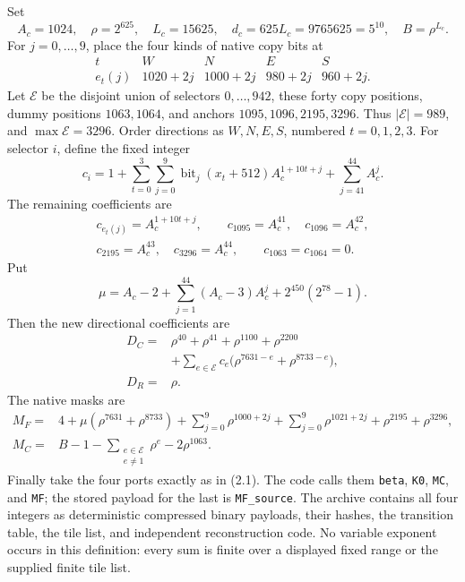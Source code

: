 Set
\[
A_c=1024,\quad \rho=2^{625},\quad L_c=15625,\quad
d_c=625L_c=9765625=5^{10},\quad B=\rho^{L_c}.
\tag{7.1}
\]
For \(j=0,\ldots,9\), place the four kinds of native copy bits at
\[
\begin{array}{c|rrrr}
t&W&N&E&S\\ \hline
e_t(j)&1020+2j&1000+2j&980+2j&960+2j.
\end{array}
\tag{7.2}
\]
Let \(\mathcal E\) be the disjoint union of selectors \(0,\ldots,942\),
these forty copy positions, dummy positions \(1063,1064\), and
anchors \(1095,1096,2195,3296\).
Thus \(|\mathcal E|=989\), and \(\max\mathcal E=3296\).
Order directions as \(W,N,E,S\), numbered \(t=0,1,2,3\).
For selector \(i\), define the fixed integer
\[
c_i=1+\sum_{t=0}^3\sum_{j=0}^9
 \operatorname{bit}_j(x_t+512)A_c^{1+10t+j}
 +\sum_{j=41}^{44}A_c^j.
\tag{7.3}
\]
The remaining coefficients are
\[
\begin{gathered}
c_{e_t(j)}=A_c^{1+10t+j},\qquad
c_{1095}=A_c^{41},\quad c_{1096}=A_c^{42},\\
c_{2195}=A_c^{43},\quad c_{3296}=A_c^{44},\qquad
c_{1063}=c_{1064}=0.
\end{gathered}
\]
Put
\[
\mu=A_c-2+\sum_{j=1}^{44}(A_c-3)A_c^j
       +2^{450}(2^{78}-1).
\]
Then the new directional coefficients are
\[
\begin{split}
D_C={}&\rho^{40}+\rho^{41}+\rho^{1100}+\rho^{2200}\\
 &+\sum_{e\in\mathcal E}c_e
       \bigl(\rho^{7631-e}+\rho^{8733-e}\bigr),\\
D_R={}&\rho.
\end{split}
\tag{7.4}
\]
The native masks are
\[
\begin{split}
M_F={}&4+\mu(\rho^{7631}+\rho^{8733})
 +\sum_{j=0}^9\rho^{1000+2j}
 +\sum_{j=0}^9\rho^{1021+2j}
 +\rho^{2195}+\rho^{3296},\\
M_C={}&B-1-\sum_{\substack{e\in\mathcal E\\e\ne1}}\rho^e
          -2\rho^{1063}.
\end{split}
\tag{7.5}
\]
Finally take the four ports exactly as in (2.1).
The code calls them \texttt{beta}, \texttt{K0}, \texttt{MC},
and \texttt{MF}; the stored payload for the last is
\texttt{MF\_source}.
The archive contains all four integers as deterministic compressed
binary payloads, their hashes, the transition table, the tile list,
and independent reconstruction code.
No variable exponent occurs in this definition: every sum is finite
over a displayed fixed range or the supplied finite tile list.

